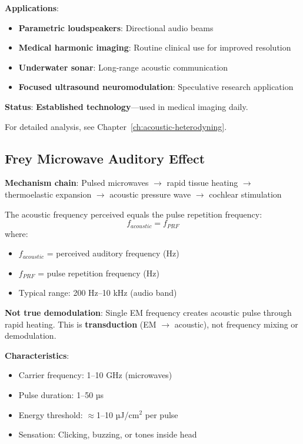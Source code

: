 \begin{scope}[shift={(8,0)}]
\textbf{Applications}:
\begin{itemize}
\item \textbf{Parametric loudspeakers}: Directional audio beams
\item \textbf{Medical harmonic imaging}: Routine clinical use for improved resolution
\item \textbf{Underwater sonar}: Long-range acoustic communication
\item \textbf{Focused ultrasound neuromodulation}: Speculative research application
\end{itemize}

\textbf{Status}: \textbf{Established technology}---used in medical imaging daily.

For detailed analysis, see Chapter~\ref{ch:acoustic-heterodyning}.

\subsection{Frey Microwave Auditory Effect}

\textbf{Mechanism chain}: Pulsed microwaves $\rightarrow$ rapid tissue heating $\rightarrow$ thermoelastic expansion $\rightarrow$ acoustic pressure wave $\rightarrow$ cochlear stimulation

The acoustic frequency perceived equals the pulse repetition frequency:
\begin{equation}
\label{eq:frey-frequency}
f_{acoustic} = f_{PRF}
\end{equation}
where:
\begin{itemize}
\item $f_{acoustic}$ = perceived auditory frequency (Hz)
\item $f_{PRF}$ = pulse repetition frequency (Hz)
\item Typical range: 200 Hz--10 kHz (audio band)
\end{itemize}

\begin{warningbox}
\textbf{Not true demodulation}: Single EM frequency creates acoustic pulse through rapid heating. This is \textbf{transduction} (EM $\rightarrow$ acoustic), not frequency mixing or demodulation.
\end{warningbox}

\textbf{Characteristics}:
\begin{itemize}
\item Carrier frequency: 1--10 GHz (microwaves)
\item Pulse duration: 1--50 µs
\item Energy threshold: $\approx$1--10 µJ/cm$^2$ per pulse
\item Sensation: Clicking, buzzing, or tones inside head
\end{itemize}


\end{scope}
